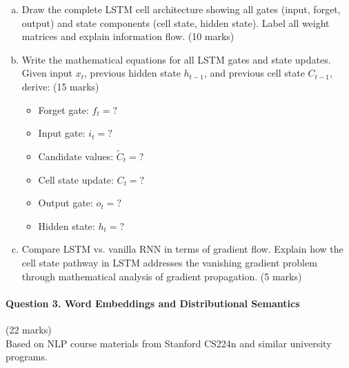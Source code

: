 \documentclass[12pt]{article}
\newcommand{\shortanswer}{\vspace{2cm}}
\newcommand{\mediumanswer}{\vspace{3cm}}
\newcommand{\journalspace}{\vspace{4.5cm}}
\begin{document}
\begin{enumerate}[(a)]
    \item Draw the complete LSTM cell architecture showing all gates (input, forget, output) and state components (cell state, hidden state). Label all weight matrices and explain information flow. \hfill (10 marks)
    
    \begin{center}
    \end{center}
    
    \shortanswer
    
    \item Write the mathematical equations for all LSTM gates and state updates. Given input $x_t$, previous hidden state $h_{t-1}$, and previous cell state $C_{t-1}$, derive: \hfill (15 marks)
    \begin{itemize}
        \item Forget gate: $f_t = ?$
        \item Input gate: $i_t = ?$
        \item Candidate values: $\tilde{C}_t = ?$
        \item Cell state update: $C_t = ?$
        \item Output gate: $o_t = ?$
        \item Hidden state: $h_t = ?$
    \end{itemize}
    
    \journalspace
    
    \item Compare LSTM vs. vanilla RNN in terms of gradient flow. Explain how the cell state pathway in LSTM addresses the vanishing gradient problem through mathematical analysis of gradient propagation. \hfill (5 marks)
    
    \mediumanswer
\end{enumerate}

\newpage
\paragraph{Question 3. Word Embeddings and Distributional Semantics}\hfill (22 marks)\\
Based on NLP course materials from Stanford CS224n and similar university programs.
\end{document}

